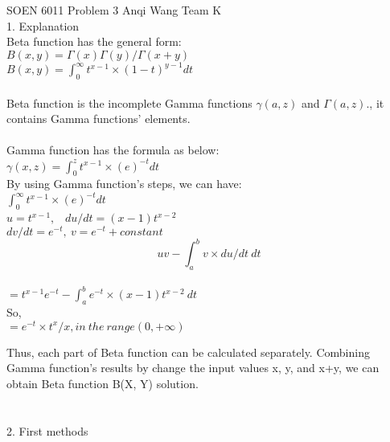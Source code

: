 \documentclass{article} \usepackage{mathtools} \usepackage{algorithm}
\begin{document}
 
{\Large SOEN 6011 Problem 3 Anqi Wang Team K } \\


{\large 1. Explanation }\\
Beta function has the general form: \\

 \State $ B (x,y) =  \Gamma(x) \Gamma(y)  / \Gamma( x+y) $ \\
 \State $ B (x,y) =  $$\int_{0}^{\infty} t^{x-1} \times (1-t)^{y-1} dt$$  $ \\ \\
 
\State Beta function is the incomplete Gamma functions $ \gamma (a,z) $ and $\Gamma(a,z)$., it contains Gamma functions' elements. \\ \\
 Gamma function has the formula as below: \\
$\gamma(x,z) = $$\int_{0}^{z} t^{x-1} \times (e)^{-t} dt$$  $ \\

\State By using Gamma function's steps, we can have: \\
$ $$\int_{0}^{\infty} t^{x-1} \times (e)^{-t} dt$$ $ \\
$u = t^{x-1}, $ \ $du/dt = (x-1)t^{x-2} $ \\
$dv/dt = e^{-t}, \ v = e^{-t} + constant$ \\
$$ uv - \int_{a}^{b} v \times du/dt \  dt$$ \\
$ $$=t^{x-1}e^{-t}-\int_{a}^{b} e^{-t} \times (x-1)t^{x-2} \  dt $$ $ \\
So, \\
$=e^{-t} \times t^x/x, in \ the \ range (0, + \infty) $




\State Thus, each part of Beta function can be calculated separately. Combining Gamma function's results by change the input values x, y, and x+y, we can obtain Beta function B(X, Y) solution. \\  \\ \\

{\large 2. First methods  }\\
\end{document}
